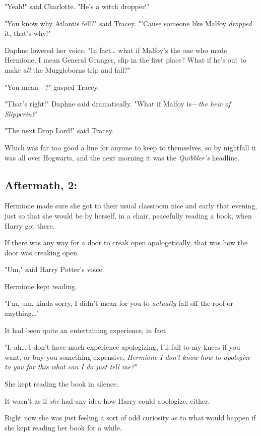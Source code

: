 "Yeah!" said Charlotte. "He's a witch dropper!"

"You know why Atlantis fell?" said Tracey. "'Cause someone like Malfoy 
\emph{dropped} it, that's why!"

Daphne lowered her voice. "In fact{\ldots} what if Malfoy's the one who made 
Hermione, I mean General Granger, slip in the first place? What if he's out to 
make \emph{all} the Muggleborns trip and fall?"

"You mean---?" gasped Tracey.

"That's right!" Daphne said dramatically. "What if Malfoy is---\emph{the heir 
of Slipperin?}"

"The next Drop Lord!" said Tracey.

Which was far too good a line for anyone to keep to themselves, so by nightfall 
it was all over Hogwarts, and the next morning it was the \emph{Quibbler's} 
headline.
\sbreak
\subsection{Aftermath, 2:}

Hermione made sure she got to their usual classroom nice and early that 
evening, just so that she would be by herself, in a chair, peacefully reading a 
book, when Harry got there.

If there was any way for a door to creak open apologetically, that was how the 
door was creaking open.

"Um," said Harry Potter's voice.

Hermione kept reading.

"I'm, um, kinda sorry, I didn't mean for you to \emph{actually} fall off the 
roof or anything{\ldots}"

It had been quite an entertaining experience, in fact.

"I, ah{\ldots} I don't have much experience apologizing, I'll fall to my knees 
if you want, or buy you something expensive, \emph{Hermione I don't know how to 
apologize to you for this what can I do just tell me?}"

She kept reading the book in silence.

It wasn't as if \emph{she} had any idea how Harry could apologize, either.

Right now she was just feeling a sort of odd curiosity as to what would happen 
if she kept reading her book for a while.
